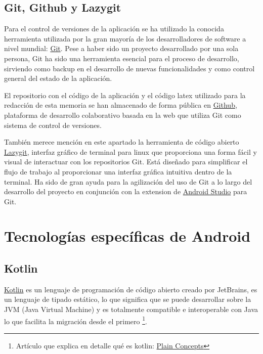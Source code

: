 \subsection{Git, Github y Lazygit}
Para el control de versiones de la aplicación se ha utilizado la conocida herramienta utilizada por la gran mayoría de los desarrolladores de software a nivel mundial: \href{https://git-scm.com/}{Git}. Pese a haber sido un proyecto desarrollado por una sola persona, Git ha sido una herramienta esencial para el proceso de desarrollo, sirviendo como backup en el desarrollo de nuevas funcionalidades y como control general del estado de la aplicación. 

El repositorio con el código de la aplicación y el código latex utilizado para la redacción de esta memoria se han almacenado de forma pública en \href{https://github.com/}{Github}, plataforma de desarrollo colaborativo basada en la web que utiliza Git como sistema de control de versiones.

También merece mención en este apartado la herramienta de código abierto \href{https://github.com/jesseduffield/lazygit}{Lazygit}, interfaz gráfico de terminal para linux que proporciona una forma fácil y visual de interactuar con los repositorios Git. Está diseñado para simplificar el flujo de trabajo al proporcionar una interfaz gráfica intuitiva dentro de la terminal. Ha sido de gran ayuda para la agilización del uso de Git a lo largo del desarrollo del proyecto en conjunción con la extension de \hyperlink{subsec:android_studio}{Android Studio} para Git.



\section{Tecnologías específicas de Android}

\subsection{Kotlin}\hypertarget{subsec:kotlin}{}
\href{https://kotlinlang.org/}{Kotlin} es un lenguaje de programación de código abierto creado por JetBrains, es un lenguaje de tipado estático, lo que significa que se puede desarrollar sobre la JVM (Java Virtual Machine) y es totalmente compatible e interoperable con Java lo que facilita la migración desde el primero \footnote{Artículo que explica en detalle qué es kotlin: \href{https://www.plainconcepts.com/es/kotlin-android/}{Plain Concepts}}. 

